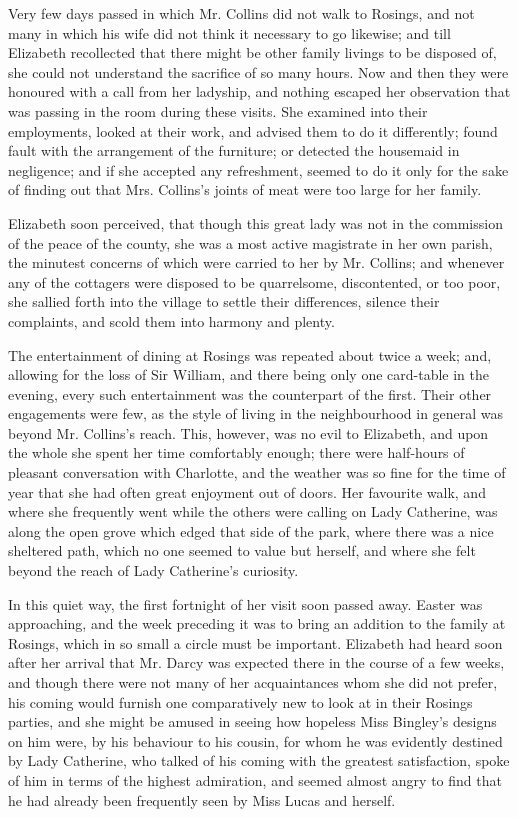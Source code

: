 Very few days passed in which Mr. Collins did not walk to Rosings, and not many in which his wife did not think it necessary to go likewise; and till Elizabeth recollected that there might be other family livings to be disposed of, she could not understand the sacrifice of so many hours. Now and then they were honoured with a call from her ladyship, and nothing escaped her observation that was passing in the room during these visits. She examined into their employments, looked at their work, and advised them to do it differently; found fault with the arrangement of the furniture; or detected the housemaid in negligence; and if she accepted any refreshment, seemed to do it only for the sake of finding out that Mrs. Collins's joints of meat were too large for her family.

Elizabeth soon perceived, that though this great lady was not in the commission of the peace of the county, she was a most active magistrate in her own parish, the minutest concerns of which were carried to her by Mr. Collins; and whenever any of the cottagers were disposed to be quarrelsome, discontented, or too poor, she sallied forth into the village to settle their differences, silence their complaints, and scold them into harmony and plenty.

The entertainment of dining at Rosings was repeated about twice a week; and, allowing for the loss of Sir William, and there being only one card-table in the evening, every such entertainment was the counterpart of the first. Their other engagements were few, as the style of living in the neighbourhood in general was beyond Mr. Collins's reach. This, however, was no evil to Elizabeth, and upon the whole she spent her time comfortably enough; there were half-hours of pleasant conversation with Charlotte, and the weather was so fine for the time of year that she had often great enjoyment out of doors. Her favourite walk, and where she frequently went while the others were calling on Lady Catherine, was along the open grove which edged that side of the park, where there was a nice sheltered path, which no one seemed to value but herself, and where she felt beyond the reach of Lady Catherine's curiosity.

In this quiet way, the first fortnight of her visit soon passed away. Easter was approaching, and the week preceding it was to bring an addition to the family at Rosings, which in so small a circle must be important. Elizabeth had heard soon after her arrival that Mr. Darcy was expected there in the course of a few weeks, and though there were not many of her acquaintances whom she did not prefer, his coming would furnish one comparatively new to look at in their Rosings parties, and she might be amused in seeing how hopeless Miss Bingley's designs on him were, by his behaviour to his cousin, for whom he was evidently destined by Lady Catherine, who talked of his coming with the greatest satisfaction, spoke of him in terms of the highest admiration, and seemed almost angry to find that he had already been frequently seen by Miss Lucas and herself.


